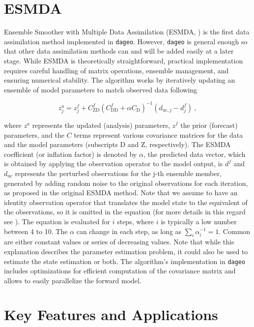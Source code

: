 \documentclass[a4paper, colorlinks=false, 11pt, parskip=half,
               notitlepage, oneside, fleqn, pdftex]{scrartcl}
\newcommand{\mr}[1]{\mathrm{#1}}
\begin{document}
\section*{ESMDA}

Ensemble Smoother with Multiple Data Assimilation (ESMDA, \cite{esmda}) is the
first data assimilation method implemented in \texttt{dageo}. However,
\texttt{dageo} is general enough so that other data assimilation methods can
and will be added easily at a later stage. While ESMDA is theoretically
straightforward, practical implementation requires careful handling of matrix
operations, ensemble management, and ensuring numerical stability. The
algorithm works by iteratively updating an ensemble of model parameters to
match observed data following

\begin{equation}
  z_j^a = z_j^f + C_\mr{ZD}^f \left(C_\mr{DD}^f + \alpha C_\mr{D}
          \right)^{-1}\left(d_{\mr{uc},j} - d_j^f \right) \ ,
\end{equation}

where $z^a$ represents the updated (analysis) parameters, $z^f$ the prior
(forecast) parameters, and the $C$ terms represent various covariance matrices
for the data and the model parameters (subscripts D and Z, respectively). The
ESMDA coefficient (or inflation factor) is denoted by $\alpha$, the predicted
data vector, which is obtained by applying the observation operator to the
model output, is $d^f$ and $d_{\mr{uc}}$ represents the perturbed observations
\citep{burgers} for the j-th ensemble member, generated by adding random noise
to the original observations for each iteration, as proposed in the original
ESMDA method. Note that we assume to have an identity observation operator that
translates the model state to the equivalent of the observations, so it is
omitted in the equation (for more details in this regard see \cite{evensen}).
The equation is evaluated for $i$ steps, where $i$ is typically a low number
between 4 to 10. The $\alpha$ can change in each step, as long as $\sum_i
\alpha_i^{-1} = 1$. Common are either constant values or series of
decreasing values. Note that while this explanation describes the parameter
estimation problem, it could also be used to estimate the state estimation or
both. The algorithm's implementation in \texttt{dageo} includes optimizations
for efficient computation of the covariance matrix and allows to easily
parallelize the forward model.

\section*{Key Features and Applications}
\end{document}
